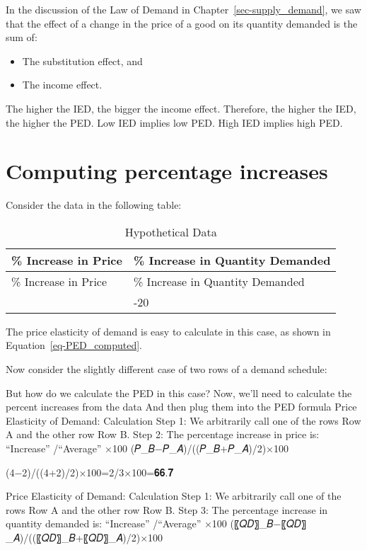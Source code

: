 \documentclass[
  letterpaper,
]{book}
\providecommand{\tightlist}{%
  \setlength{\itemsep}{0pt}\setlength{\parskip}{0pt}}\usepackage{longtable,booktabs,array}
\begin{document}
In the discussion of the Law of Demand in
Chapter~\ref{sec-supply_demand}, we saw that the effect of a change in
the price of a good on its quantity demanded is the sum of:

\begin{itemize}
\tightlist
\item
  The substitution effect, and
\item
  The income effect.
\end{itemize}

The higher the IED, the bigger the income effect. Therefore, the higher
the IED, the higher the PED. Low IED implies low PED. High IED implies
high PED.

\section{Computing percentage
increases}\label{computing-percentage-increases}

Consider the data in the following table:

\begin{longtable}[]{@{}ll@{}}
\caption{Hypothetical Data}\label{tbl-pct_increases}\tabularnewline
\toprule\noalign{}
\% Increase in Price & \% Increase in Quantity Demanded \\
\midrule\noalign{}
\endfirsthead
\toprule\noalign{}
\% Increase in Price & \% Increase in Quantity Demanded \\
\midrule\noalign{}
\endhead
\bottomrule\noalign{}
\endlastfoot
10 & -20 \\
\end{longtable}

The price elasticity of demand is easy to calculate in this case, as
shown in Equation~\ref{eq-PED_computed}.

Now consider the slightly different case of two rows of a demand
schedule:

But how do we calculate the PED in this case? Now, we'll need to
calculate the percent increases from the data And then plug them into
the PED formula Price Elasticity of Demand: Calculation Step 1: We
arbitrarily call one of the rows Row A and the other row Row B. Step 2:
The percentage increase in price is: ``Increase'' /``Average'' ×100
(𝑃\_𝐵−𝑃\_𝐴)/((𝑃\_𝐵+𝑃\_𝐴)/2)×100

(4−2)/((4+2)/2)×100=2/3×100=𝟔𝟔.𝟕

Price Elasticity of Demand: Calculation Step 1: We arbitrarily call one
of the rows Row A and the other row Row B. Step 3: The percentage
increase in quantity demanded is: ``Increase'' /``Average'' ×100
(〖𝑄𝐷〗\_𝐵−〖𝑄𝐷〗\_𝐴)/((〖𝑄𝐷〗\_𝐵+〖𝑄𝐷〗\_𝐴)/2)×100
\end{document}
